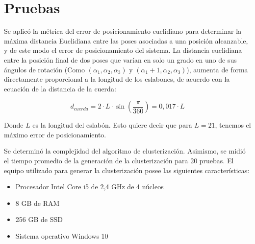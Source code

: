 \section{Pruebas}

Se aplicó la métrica del error de posicionamiento euclidiano para determinar la máxima distancia Euclidiana entre las poses asociadas a una posición alcanzable, y de este modo el error de posicionamiento del sistema. La distancia euclidiana entre la posición final de dos poses que varían en solo un grado en uno de sus ángulos de rotación (Como $(\alpha_1,\alpha_2,\alpha_3)$ y $(\alpha_1 + 1, \alpha_2, \alpha_3)$), aumenta de forma directamente proporcional a la longitud de los eslabones, de acuerdo con la ecuación de la distancia de la cuerda:

\begin{equation}
	d_{cuerda} = 2 \cdot L \cdot \sin(\frac{\pi}{360}) = 0,017 \cdot L
\end{equation}

Donde $L$ es la longitud del eslabón. Esto quiere decir que para $L = 21$, tenemos el máximo error de posicionamiento.

Se determinó la complejidad del algoritmo de clusterización. Asimismo, se midió el tiempo promedio de la generación de la clusterización para 20 pruebas. El equipo utilizado para generar la clusterización posee las siguientes características:

\begin{itemize}
	\item Procesador Intel Core i5 de 2,4 GHz de 4 núcleos
	\item 8 GB de RAM
	\item 256 GB de SSD
	\item Sistema operativo Windows 10
\end{itemize}

